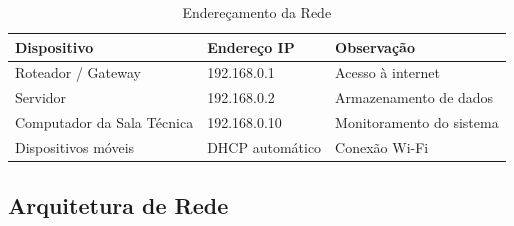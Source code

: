 \begin{table}[H]
\centering
\caption{Endereçamento da Rede}
\label{tab:rede}
\begin{tabular}{|l|l|p{6cm}|}
\hline
\textbf{Dispositivo} & \textbf{Endereço IP} & \textbf{Observação} \\
\hline
Roteador / Gateway & 192.168.0.1 & Acesso à internet \\
\hline
Servidor & 192.168.0.2 & Armazenamento de dados \\
\hline
Computador da Sala Técnica & 192.168.0.10 & Monitoramento do sistema \\
\hline
Dispositivos móveis & DHCP automático & Conexão Wi-Fi \\
\hline
\end{tabular}
\end{table}

\subsection{Arquitetura de Rede}

